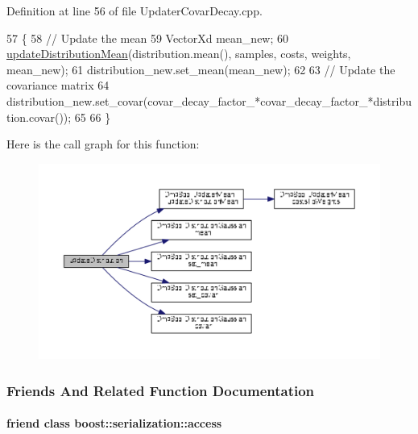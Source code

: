 Definition at line 56 of file Updater\+Covar\+Decay.\+cpp.


\begin{DoxyCode}
57 \{
58   \textcolor{comment}{// Update the mean}
59   VectorXd mean\_new;
60   \hyperlink{classDmpBbo_1_1UpdaterMean_a97c2ddfabeee67dba0044f405f4ce8c0}{updateDistributionMean}(distribution.mean(), samples, costs, weights, mean\_new); 
61   distribution\_new.set\_mean(mean\_new);
62   
63   \textcolor{comment}{// Update the covariance matrix}
64   distribution\_new.set\_covar(covar\_decay\_factor\_*covar\_decay\_factor\_*distribution.covar());
65   
66 \}
\end{DoxyCode}


Here is the call graph for this function\+:
\nopagebreak
\begin{figure}[H]
\begin{center}
\leavevmode
\includegraphics[width=350pt]{classDmpBbo_1_1UpdaterCovarDecay_aabb65aaf08049416ed18b294d5fca415_cgraph}
\end{center}
\end{figure}




\subsubsection{Friends And Related Function Documentation}
\hypertarget{classDmpBbo_1_1UpdaterCovarDecay_ac98d07dd8f7b70e16ccb9a01abf56b9c}{
\paragraph[{boost\+::serialization\+::access}]{\setlength{\rightskip}{0pt plus 5cm}friend class boost\+::serialization\+::access\hspace{0.3cm}{\ttfamily [friend]}}}\label{classDmpBbo_1_1UpdaterCovarDecay_ac98d07dd8f7b70e16ccb9a01abf56b9c}


